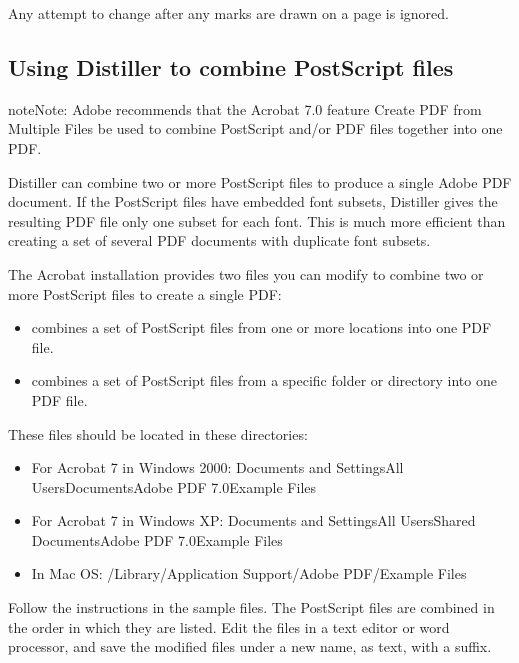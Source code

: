 \documentclass[letterpaper,12pt,english,openany,oneside]{sphinxmanual}
\begin{document}
Any attempt to change  after any marks are drawn on a page is ignored.


\subsection{Using Distiller to combine PostScript files}
\label{\detokenize{index:using-distiller-to-combine-postscript-files}}
\begin{sphinxadmonition}{note}{Note:}
Adobe recommends that the Acrobat 7.0 feature Create PDF from Multiple Files be used to combine PostScript and/or PDF files together into one PDF.
\end{sphinxadmonition}

Distiller can combine two or more PostScript files to produce a single Adobe PDF document. If the PostScript files have embedded font subsets, Distiller gives the resulting PDF file only one subset for each font. This is much more efficient than creating a set of several PDF documents with duplicate font subsets.

The Acrobat installation provides two files you can modify to combine two or more PostScript files to create a single PDF:
\begin{itemize}
\item {} 
 combines a set of PostScript files from one or more locations into one PDF file.

\item {} 
 combines a set of PostScript files from a specific folder or directory into one PDF file.

\end{itemize}

These files should be located in these directories:
\begin{itemize}
\item {} 
For Acrobat 7 in Windows 2000: Documents and SettingsAll UsersDocumentsAdobe PDF 7.0Example Files

\item {} 
For Acrobat 7 in Windows XP: Documents and SettingsAll UsersShared DocumentsAdobe PDF 7.0Example Files

\item {} 
In Mac OS: /Library/Application Support/Adobe PDF/Example Files

\end{itemize}

Follow the instructions in the sample files. The PostScript files are combined in the order in which they are listed. Edit the files in a text editor or word processor, and save the modified files under a new name, as text, with a  suffix.
\end{document}
